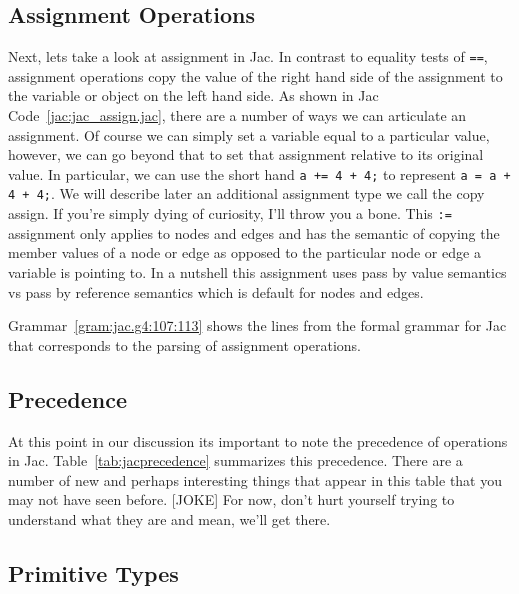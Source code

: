 \subsection{Assignment Operations}
Next, lets take a look at assignment in Jac. In contrast to equality tests of \texttt{==}, assignment operations copy the value of the right hand side of the assignment to the variable or object on the left hand side.
As shown in Jac Code~\ref{jac:jac_assign.jac}, there are a number of ways we can articulate an assignment. Of course we can simply set a variable equal to a particular value, however, we can go beyond that to set that assignment relative to its original value. In particular, we can use the short hand \texttt{a += 4 + 4;} to represent \texttt{a = a + 4 + 4;}. We will describe later an additional assignment type we call the copy assign. If you're simply dying of curiosity, I'll throw you a bone. This \texttt{:=} assignment only applies to nodes and edges and has the semantic of copying the member values of a node or edge as opposed to the particular node or edge a variable is pointing to. In a nutshell this assignment uses pass by value semantics vs pass by reference semantics which is default for nodes and edges.

\begin{nerd}
    Grammar~\ref{gram:jac.g4:107:113} shows the lines from the formal grammar for Jac that corresponds to the parsing of assignment operations.
\end{nerd}



\subsection{Precedence}
\printtabPrecedence
At this point in our discussion its important to note the precedence of operations in Jac. Table~\ref{tab:jacprecedence} summarizes this precedence. There are a number of new and perhaps interesting things that appear in this table that you may not have seen before. [JOKE] For now, don't hurt yourself trying to understand what they are and mean, we'll get there.

\subsection{Primitive Types}

